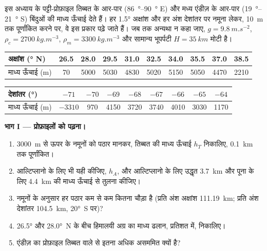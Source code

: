 \begin{problem}[{सप्ताहांत समस्या --- दो पठार}]\label{pb:b2:himalaya-andes:1}
इस अध्याय के पट्टी-प्रोफ़ाइल तिब्बत के आर-पार
(\qtyrange{86}{90}{\degree} E) और मध्य एंडीज़ के आर-पार (\qtyrange{19}{21}{\degree} S) बिंदुओं की माध्य ऊँचाई देते हैं।
हर \ang{1.5} अक्षांश और हर अंश देशांतर पर नमूना लेकर, \qty{10}{m} तक पूर्णांकित करने पर, वे
इस प्रकार पढ़े जाते हैं। जब तक अन्यथा न कहा जाए, $g = \qty{9.8}{m.s^{-2}}$, $\rho_c = \qty{2700}{kg.m^{-3}}$,
$\rho_m = \qty{3300}{kg.m^{-3}}$ और सामान्य भूपर्पटी $H = \qty{35}{km}$ मोटी है।

\smallskip
\begin{center}\small
\begin{tabular}{l|ccccccccc}
अक्षांश (\unit{\degree} N) & 26.5 & 28.0 & 29.5 & 31.0 & 32.5 & 34.0 & 35.5 & 37.0 & 38.5 \\ \hline
माध्य ऊँचाई (\unit{m}) & 70 & 5000 & 5030 & 4830 & 5020 & 5150 & 5050 & 4470 & 2210
\end{tabular}

\smallskip
\begin{tabular}{l|cccccccc}
देशांतर (\unit{\degree}) & $-71$ & $-70$ & $-69$ & $-68$ & $-67$ & $-66$ & $-65$ & $-64$ \\ \hline
माध्य ऊँचाई (\unit{m}) & $-3310$ & 970 & 4150 & 3720 & 3740 & 4010 & 3030 & 1170
\end{tabular}
\end{center}
\smallskip

\noindent\textbf{भाग I --- प्रोफ़ाइलों को पढ़ना।}
\begin{enumerate}
\item \qty{3000}{m} से ऊपर के नमूनों को पठार मानकर, तिब्बत की माध्य ऊँचाई
$h_T$ निकालिए, \qty{0.1}{km} तक पूर्णांकित।
\item आल्टिप्लानो के लिए भी यही कीजिए, $h_A$, और आल्टिप्लानो के लिए उद्धृत
\qty{3.7}{km} और पूना के लिए \qty{4.4}{km} की माध्य ऊँचाई से तुलना कीजिए।
\item नमूनों के अनुसार हर पठार कम से कम कितना चौड़ा है (प्रति अंश अक्षांश \qty{111.19}{km};
प्रति अंश देशांतर \qty{104.5}{km}, \ang{20}~S पर)?
\item \ang{26.5} और \ang{28.0}~N के बीच हिमालयी अग्र का माध्य ढलान,
प्रतिशत में, निकालिए।
\item एंडीज़ का प्रोफ़ाइल तिब्बत वाले से इतना अधिक असममित क्यों है?
\end{enumerate}


\end{problem}
